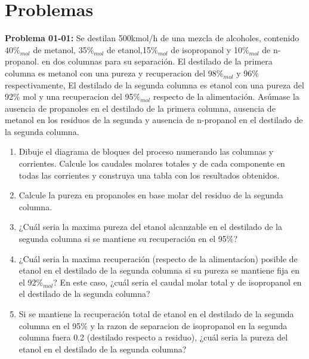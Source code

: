 \documentclass{report}
\begin{document}
\section{Problemas}
\begin{raggedright}
	\textbf{Problema 01-01:} 
	Se destilan 500kmol/h de una mezcla de alcoholes, contenido 40$\% _{mol}$ de metanol, 35$\% _{mol}$ de etanol,15$\% _{mol}$ de isopropanol y 10$\% _{mol}$ de n-propanol.
		en dos columnas para su separación. El destilado de la primera columna es metanol con una pureza y recuperacion del 98$\% _{mol}$ y 96$\%$ respectivamente, 
		El destilado de la segunda columna es etanol con una pureza del 92$\%$ mol y una recuperacion del 95$\% _{mol}$ respecto de la alimentación. Asúmase la ausencia de propanoles en el destilado de la primera columna, ausencia de metanol en los residuos de la segunda y ausencia de n-propanol en el destilado de la segunda columna.
	\begin{enumerate}[label=\textbf{\alph*)}]
		\item Dibuje el diagrama de bloques del proceso numerando las columnas y corrientes. Calcule los caudales molares totales y de cada componente en todas las corrientes y construya una tabla con los resultados obtenidos.
		\item Calcule la pureza en propanoles en base molar del residuo de la segunda columna.
		\item ¿Cuál seria la maxima pureza del etanol alcanzable en el destilado de la segunda columna si se mantiene su recuperación en el 95$\%$?
		\item ¿Cuál seria la maxima recuperación (respecto de la alimentacíon) posible de etanol en el destilado de la segunda columna si su pureza se mantiene fija en el 92$\% _{mol}$? En este caso, ¿cuál seria el caudal molar total y de isopropanol en el destilado de la segunda columna?
		\item Si se mantiene la recuperación total de etanol en el destilado de la segunda columna en el 95$\%$ y la razon de separacion de isopropanol en la segunda columna fuera 0.2 (destilado respecto a residuo), ¿cuál seria la pureza del etanol en el destilado de la segunda columna?
	\end{enumerate}
\sol


\end{raggedright}
\end{document}
